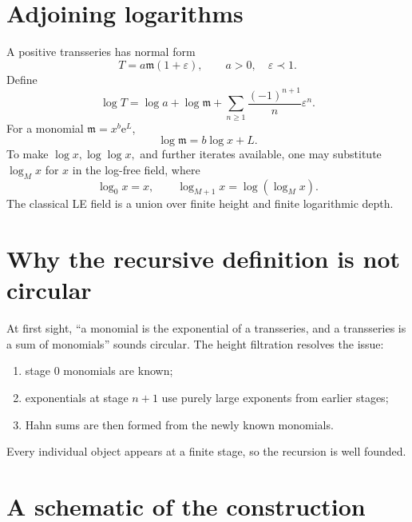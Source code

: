 \documentclass[11pt,openany]{book}
\theoremstyle{plain}
\theoremstyle{definition}
\theoremstyle{remark}
\newcommand{\R}{\mathbb{R}}
\newcommand{\Tfield}{\mathbb{T}}
\newcommand{\G}{\mathfrak{G}}
\newcommand{\m}{\mathfrak{m}}
\newcommand{\e}{\mathrm{e}}
\begin{document}
\section{Adjoining logarithms}
A positive transseries has normal form
\[
  T=a\m(1+\varepsilon),
  \qquad a>0,
  \quad \varepsilon\prec1.
\]
Define
\[
  \log T
  =\log a+\log\m+
   \sum_{n\ge1}\frac{(-1)^{n+1}}{n}\varepsilon^n.
\]
For a monomial $\m=x^b\e^L$,
\[
  \log\m=b\log x+L.
\]
To make $\log x,\log\log x,$ and further iterates available, one may substitute $\log_M x$ for $x$ in the log-free field, where
\[
  \log_0x=x,
  \qquad
  \log_{M+1}x=\log(\log_Mx).
\]
The classical LE field is a union over finite height and finite logarithmic depth.

\section{Why the recursive definition is not circular}
At first sight, ``a monomial is the exponential of a transseries, and a transseries is a sum of monomials'' sounds circular. The height filtration resolves the issue:
\begin{enumerate}
\item stage $0$ monomials are known;
\item exponentials at stage $n+1$ use purely large exponents from earlier stages;
\item Hahn sums are then formed from the newly known monomials.
\end{enumerate}
Every individual object appears at a finite stage, so the recursion is well founded.

\section{A schematic of the construction}
\begin{center}
\end{center}
\end{document}
